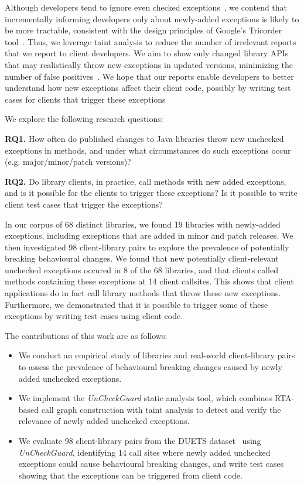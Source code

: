 Although developers tend to ignore even checked
exceptions~\cite{nakshatri16:_analy_java}, we contend that incrementally informing
developers only about newly-added exceptions is likely to be more tractable, consistent with the
design principles of Google's Tricorder tool~\cite{sadowski15:_tricor}.
Thus, we leverage taint analysis
to reduce the number of irrelevant reports that we report to client developers.
We aim to show only changed library APIs that may realistically throw new exceptions
in updated versions, minimizing the number of false positives~\cite{pashchenko20:_vuln4,pashchenko18:_vulner}.
We hope that our reports enable developers to better understand how new exceptions affect their client code,
possibly by writing test cases for clients that trigger these exceptions 

We explore the following research questions:

\noindent
{\bf RQ1.} How often do published changes to Java libraries throw new unchecked exceptions in methods,
and under what circumstances do such exceptions occur (e.g. major/minor/patch versions)?

\noindent
{\bf RQ2.} Do library clients, in practice, call methods with new added exceptions, and is it possible for the clients to trigger these exceptions? Is it possible to write client test cases that trigger the exceptions?

In our corpus of 68 distinct libraries, we found 19 libraries with newly-added exceptions, including exceptions that are added in minor and patch releases.
We then investigated 98 client-library pairs to explore the prevalence of potentially breaking behavioural changes.
We found that new potentially client-relevant unchecked exceptions occured in 8 of the 68 libraries, and that clients called methods containing these exceptions at 14 client callsites.
This shows that client applications do in fact call library methods that throw these new exceptions.
Furthermore, we demonstrated that it is possible to trigger some of these exceptions by writing test cases using client code.

The contributions of this work are as follows:

\begin{itemize}[noitemsep]
\item We conduct an empirical study of libraries and real-world client-library pairs to assess the prevalence of behavioural breaking changes caused by newly added unchecked exceptions.
\item We implement the \textit{UnCheckGuard} static analysis tool, which combines RTA-based call graph construction with taint analysis to detect and verify the relevance of newly added unchecked exceptions.
\item We evaluate 98 client-library pairs from the DUETS dataset~\cite{durieux21:_duets} using \textit{UnCheckGuard}, identifying 14 call sites where newly added unchecked exceptions could cause behavioural breaking changes, and write test cases showing that the exceptions can be triggered from client code.
\end{itemize}


